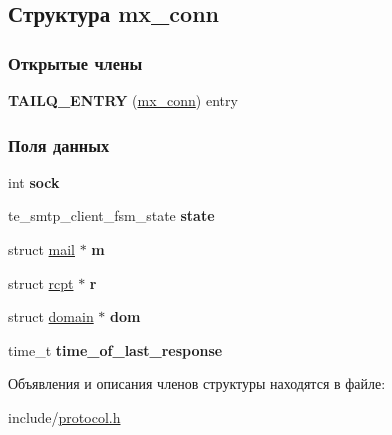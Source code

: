 \hypertarget{structmx__conn}{\subsection{Структура mx\-\_\-conn}
\label{structmx__conn}
}
\subsubsection*{Открытые члены}
\begin{DoxyCompactItemize}
\item 
\hypertarget{structmx__conn_a695731ed25cb8da1bd49a55bb9e0960f}{{\bfseries T\-A\-I\-L\-Q\-\_\-\-E\-N\-T\-R\-Y} (\hyperlink{structmx__conn}{mx\-\_\-conn}) entry}\label{structmx__conn_a695731ed25cb8da1bd49a55bb9e0960f}

\end{DoxyCompactItemize}
\subsubsection*{Поля данных}
\begin{DoxyCompactItemize}
\item 
\hypertarget{structmx__conn_a8a84d9e6cdb0ba6c6381588a48482c20}{int {\bfseries sock}}\label{structmx__conn_a8a84d9e6cdb0ba6c6381588a48482c20}

\item 
\hypertarget{structmx__conn_ab90e43887d70fcc2cdb6dfec983397f6}{te\-\_\-smtp\-\_\-client\-\_\-fsm\-\_\-state {\bfseries state}}\label{structmx__conn_ab90e43887d70fcc2cdb6dfec983397f6}

\item 
\hypertarget{structmx__conn_a68ffb03dadbb71aaeb1199c8db914236}{struct \hyperlink{structmail}{mail} $\ast$ {\bfseries m}}\label{structmx__conn_a68ffb03dadbb71aaeb1199c8db914236}

\item 
\hypertarget{structmx__conn_a8ddb76e7549fea77f5ff6695c75669b2}{struct \hyperlink{structrcpt}{rcpt} $\ast$ {\bfseries r}}\label{structmx__conn_a8ddb76e7549fea77f5ff6695c75669b2}

\item 
\hypertarget{structmx__conn_a8be21c7d0a7968ee2e68a34bf057759c}{struct \hyperlink{structdomain}{domain} $\ast$ {\bfseries dom}}\label{structmx__conn_a8be21c7d0a7968ee2e68a34bf057759c}

\item 
\hypertarget{structmx__conn_a1a40f6ea7775960c3c0d3c0130ce489b}{time\-\_\-t {\bfseries time\-\_\-of\-\_\-last\-\_\-response}}\label{structmx__conn_a1a40f6ea7775960c3c0d3c0130ce489b}

\end{DoxyCompactItemize}


Объявления и описания членов структуры находятся в файле\-:\begin{DoxyCompactItemize}
\item 
include/\hyperlink{protocol_8h}{protocol.\-h}\end{DoxyCompactItemize}
